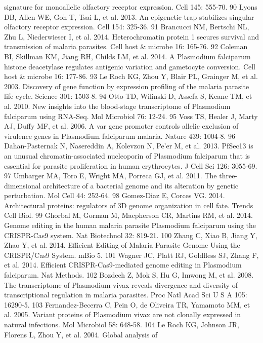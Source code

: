 signature for monoallelic olfactory receptor expression. Cell 145: 555-70.
90  Lyons DB, Allen WE, Goh T, Tsai L, et al. 2013. An epigenetic trap
stabilizes singular olfactory receptor expression. Cell 154: 325-36.
91  Brancucci NM, Bertschi NL, Zhu L, Niederwieser I, et al. 2014.
Heterochromatin protein 1 secures survival and transmission of malaria
parasites. Cell host \& microbe 16: 165-76.
92  Coleman BI, Skillman KM, Jiang RH, Childs LM, et al. 2014. A Plasmodium
falciparum histone deacetylase regulates antigenic variation and gametocyte
conversion. Cell host \& microbe 16: 177-86.
93  Le Roch KG, Zhou Y, Blair PL, Grainger M, et al. 2003. Discovery of gene
function by expression profiling of the malaria parasite life cycle. Science
301: 1503-8.
94  Otto TD, Wilinski D, Assefa S, Keane TM, et al. 2010. New insights into
the blood-stage transcriptome of Plasmodium falciparum using RNA-Seq. Mol
Microbiol 76: 12-24.
95  Voss TS, Healer J, Marty AJ, Duffy MF, et al. 2006. A var gene promoter
controls allelic exclusion of virulence genes in Plasmodium falciparum
malaria. Nature 439: 1004-8.
96  Dahan-Pasternak N, Nasereddin A, Kolevzon N, Pe'er M, et al. 2013. PfSec13
is an unusual chromatin-associated nucleoporin of Plasmodium falciparum that
is essential for parasite proliferation in human erythrocytes. J Cell Sci 126:
3055-69.
97  Umbarger MA, Toro E, Wright MA, Porreca GJ, et al. 2011. The
three-dimensional architecture of a bacterial genome and its alteration by
genetic perturbation. Mol Cell 44: 252-64.
98  Gomez-Diaz E, Corces VG. 2014. Architectural proteins: regulators of 3D
genome organization in cell fate. Trends Cell Biol.
99  Ghorbal M, Gorman M, Macpherson CR, Martins RM, et al. 2014. Genome
editing in the human malaria parasite Plasmodium falciparum using the
CRISPR-Cas9 system. Nat Biotechnol 32: 819-21.
100 Zhang C, Xiao B, Jiang Y, Zhao Y, et al. 2014. Efficient Editing of
Malaria Parasite Genome Using the CRISPR/Cas9 System. mBio 5.
101 Wagner JC, Platt RJ, Goldfless SJ, Zhang F, et al. 2014. Efficient
CRISPR-Cas9-mediated genome editing in Plasmodium falciparum. Nat Methods.
102 Bozdech Z, Mok S, Hu G, Imwong M, et al. 2008. The transcriptome of
Plasmodium vivax reveals divergence and diversity of transcriptional
regulation in malaria parasites. Proc Natl Acad Sci U S A 105: 16290-5.
103 Fernandez-Becerra C, Pein O, de Oliveira TR, Yamamoto MM, et al. 2005.
Variant proteins of Plasmodium vivax are not clonally expressed in natural
infections. Mol Microbiol 58: 648-58.
104 Le Roch KG, Johnson JR, Florens L, Zhou Y, et al. 2004. Global analysis of

